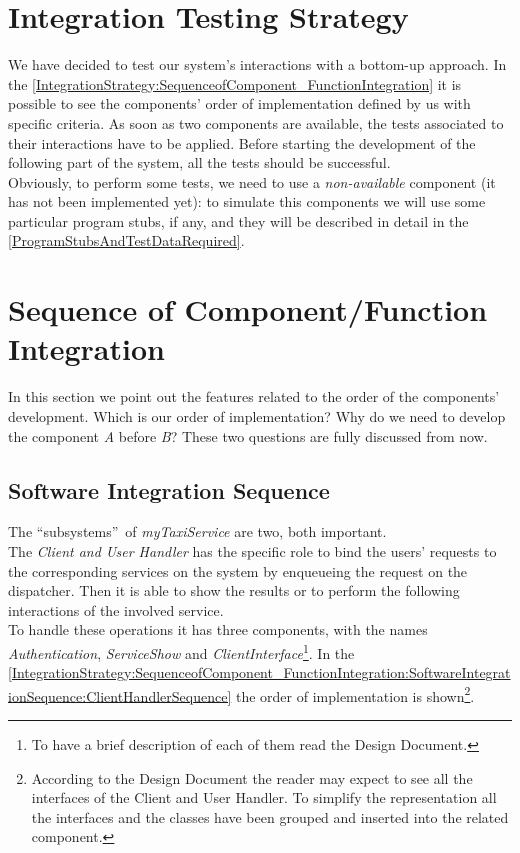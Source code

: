 \documentclass[\mainpath/main]{subfiles}
\begin{document}
\section{Integration Testing Strategy}
\label{IntegrationStrategy:IntegrationTestingStrategy}
We have decided to test our system's interactions with a bottom-up approach. In the \autoref{IntegrationStrategy:SequenceofComponent_FunctionIntegration} it is possible to see the components' order of implementation defined by us with specific criteria. As soon as two components are available, the tests associated to their interactions have to be applied. Before starting the development of the following part of the system, all the tests should be successful.\\ Obviously, to perform some tests, we need to use a \textit{non-available} component (it has not been implemented yet): to simulate this components we will use some particular program stubs, if any, and they will be described in detail in the \autoref{ProgramStubsAndTestDataRequired}.

\section{Sequence of Component/Function Integration}
\label{IntegrationStrategy:SequenceofComponent_FunctionIntegration}
In this section we point out the features related to the order of the components' development. Which is our order of implementation? Why do we need to develop the component \textit{A} before \textit{B}? These two questions are fully discussed from now.

\subsection{Software Integration Sequence}
\label{IntegrationStrategy:SequenceofComponent_FunctionIntegration:SoftwareIntegrationSequence}
The \textquotedblleft subsystems\textquotedblright\ of \textit{myTaxiService} are two, both important.\\
The \textit{Client and User Handler} has the specific role to bind the users' requests to the corresponding services on the system by enqueueing the request on the dispatcher. Then it is able to show the results or to perform the following interactions of the involved service.\\
To handle these operations it has three components, with the names \textit{Authentication}, \textit{ServiceShow} and \textit{ClientInterface}\footnote{To have a brief description of each of them read the Design Document.}. In the \autoref{IntegrationStrategy:SequenceofComponent_FunctionIntegration:SoftwareIntegrationSequence:ClientHandlerSequence} the order of implementation is shown\footnote{According to the Design Document the reader may expect to see all the interfaces of the Client and User Handler. To simplify the representation all the interfaces and the classes have been grouped and inserted into the related component.}.
\end{document}
